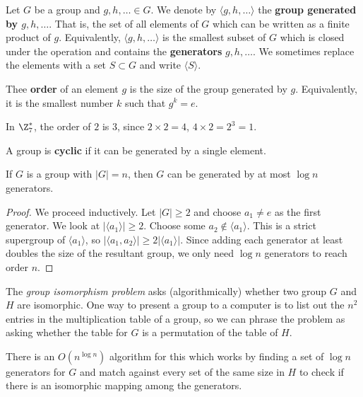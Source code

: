 \begin{definition}
	Let $G$ be a group and $g,h,\dots\in G$.  We denote by $\langle g,h,\dots \rangle$ the \textbf{group generated by $g,h,\dots$}.  That is, the set of all elements of $G$ which can be written as a finite product of $g$.  Equivalently, $\langle g,h,\dots \rangle$ is the smallest subset of $G$ which is closed under the operation and contains the \textbf{generators} $g,h,\dots$.  We sometimes replace the elements with a set $S\subset G$ and write $\langle S \rangle$.
\end{definition}


\begin{definition}
	Thee \textbf{order} of an element $g$ is the size of the group generated by $g$.  Equivalently, it is the smallest number $k$ such that $g^k=e$.
\end{definition}

\begin{example}
	In $\Z_7^*$, the order of $2$ is 3, since $2\times 2 = 4$, $4\times 2=2^3=1$.
\end{example}

\begin{definition}
	A group is \textbf{cyclic} if it can be generated by a single element.
\end{definition}

\begin{lemma}
	If $G$ is a group with  $|G|=n$, then $G$ can be generated by at most $\log{n}$ generators.
\end{lemma}
\begin{proof}
	We proceed inductively. Let $|G|\geq 2$ and choose $a_1\neq e$ as the first generator.  We look at $|\langle a_1 \rangle |\geq 2$.  Choose some $a_2\notin \langle a_1 \rangle $.  This is a strict supergroup of $\langle a_1 \rangle $, so $|\langle a_1,a_2 \rangle | \geq 2|\langle a_1 \rangle |$.  Since adding each generator at least doubles the size of the resultant group, we only need $\log{n}$ generators to reach order $n$.
\end{proof}

\begin{example}
 The \textit{group isomorphism problem} asks (algorithmically) whether two group $G$ and $H$ are isomorphic.  One way to present a group to a computer is to list out the $n^2$ entries in the multiplication table of a group, so we can phrase the problem as asking whether the table for $G$ is a permutation of the table of $H$.
 
 There is an $O(n^{\log{n}})$ algorithm for this which works by finding a set of $\log{n}$ generators for $G$ and match against every set of the same size in $H$ to check if there is an isomorphic mapping among the generators. 
\end{example}



